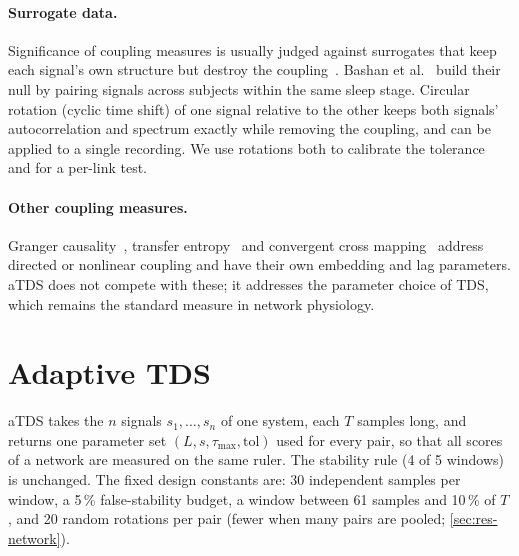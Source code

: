 \documentclass[11pt,a4paper]{article}
\newcommand{\tmax}{\tau_{\max}}
\newcommand{\tol}{\mathrm{tol}}
\begin{document}
\paragraph{Surrogate data.} Significance of coupling measures is usually judged against surrogates that keep each signal's own structure but destroy the coupling~\cite{theiler1992testing,schreiber2000surrogate,lancaster2018surrogate}. Bashan et al.~\cite{bashan2012network} build their null by pairing signals across subjects within the same sleep stage. Circular rotation (cyclic time shift) of one signal relative to the other keeps both signals' autocorrelation and spectrum exactly while removing the coupling, and can be applied to a single recording. We use rotations both to calibrate the tolerance and for a per-link test.

\paragraph{Other coupling measures.} Granger causality~\cite{granger1969investigating}, transfer entropy~\cite{schreiber2000measuring} and convergent cross mapping~\cite{sugihara2012detecting} address directed or nonlinear coupling and have their own embedding and lag parameters. aTDS does not compete with these; it addresses the parameter choice of TDS, which remains the standard measure in network physiology.

\section{Adaptive TDS}
\label{sec:method}

aTDS takes the $n$ signals $s_1, \dots, s_n$ of one system, each $T$ samples long, and returns one parameter set $(L, s, \tmax, \tol)$ used for every pair, so that all scores of a network are measured on the same ruler. The stability rule (4 of 5 windows) is unchanged. The fixed design constants are: 30 independent samples per window, a 5\,\% false-stability budget, a window between 61 samples and 10\,\% of $T$, and 20 random rotations per pair (fewer when many pairs are pooled; \cref{sec:res-network}).
\end{document}
